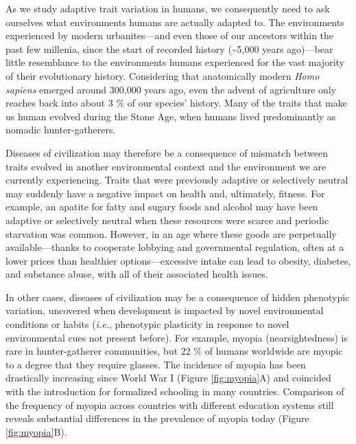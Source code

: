 \documentclass[
]{book}
\begin{document}
As we study adaptive trait variation in humans, we consequently need to ask ourselves what environments humans are actually adapted to. The environments experienced by modern urbanites---and even those of our ancestors within the past few millenia, since the start of recorded history (\textasciitilde5,000 years ago)---bear little resemblance to the environments humans experienced for the vast majority of their evolutionary history. Considering that anatomically modern \emph{Homo sapiens} emerged around 300,000 years ago, even the advent of agriculture only reaches back into about 3 \% of our species' history. Many of the traits that make us human evolved during the Stone Age, when humans lived predominantly as nomadic hunter-gatherers.

Diseases of civilization may therefore be a consequence of mismatch between traits evolved in another environmental context and the environment we are currently experiencing. Traits that were previously adaptive or selectively neutral may suddenly have a negative impact on health and, ultimately, fitness. For example, an apatite for fatty and sugary foods and alcohol may have been adaptive or selectively neutral when these resources were scarce and periodic starvation was common. However, in an age where these goods are perpetually available---thanks to cooperate lobbying and governmental regulation, often at a lower prices than healthier options---excessive intake can lead to obesity, diabetes, and substance abuse, with all of their associated health issues.

In other cases, diseases of civilization may be a consequence of hidden phenotypic variation, uncovered when development is impacted by novel environmental conditions or habits (\emph{i.e.}, phenotypic plasticity in response to novel environmental cues not present before). For example, myopia (nearsightedness) is rare in hunter-gatherer communities, but 22 \% of humans worldwide are myopic to a degree that they require glasses. The incidence of myopia has been drastically increasing since World War I (Figure \ref{fig:myopia}A) and coincided with the introduction for formalized schooling in many countries. Comparison of the frequency of myopia across countries with different education systems still reveals substantial differences in the prevalence of myopia today (Figure \ref{fig:myopia}B).
\end{document}
